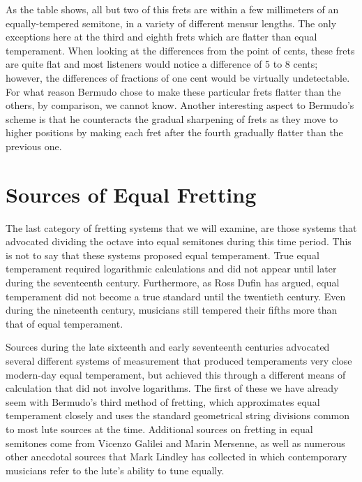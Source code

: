 As the table shows, all but two of this frets are within a few millimeters of an
equally-tempered semitone, in a variety of different mensur lengths. The only
exceptions here at the third and eighth frets which are flatter than equal temperament.
When looking at the differences from the point of cents, these frets are quite flat and
most listeners would notice a difference of 5 to 8 cents; however, the differences of
fractions of one cent would be virtually undetectable.  For what reason Bermudo chose
to make these particular frets flatter than the others, by comparison, we cannot know.
Another interesting aspect to Bermudo's scheme is that he counteracts the gradual
sharpening of frets as they move to higher positions by making each fret after the
fourth gradually flatter than the previous one.

\section{Sources of Equal Fretting}

The last category of fretting systems that we will examine, are those systems that
advocated dividing the octave into equal semitones during this time period.  This is
not to say that these systems proposed equal temperament.  True equal temperament
required logarithmic calculations and did not appear until later during the seventeenth
century.  Furthermore, as Ross Dufin has argued, equal temperament did not become a
true standard until the twentieth century.  Even during the nineteenth century,
musicians still tempered their fifths more than that of equal temperament.

Sources during the late sixteenth and early seventeenth centuries advocated several
different systems of measurement that produced temperaments very close modern-day equal
temperament, but achieved this through a different means of calculation that did not
involve logarithms.  The first of these we have already seem with Bermudo's third
method of fretting, which approximates equal temperament closely and uses the standard
geometrical string divisions common to most lute sources at the time.  Additional
sources on fretting in equal semitones come from Vicenzo Galilei and Marin Mersenne, as
well as numerous other anecdotal sources that Mark Lindley has collected in which
contemporary musicians refer to the lute's ability to tune equally.

